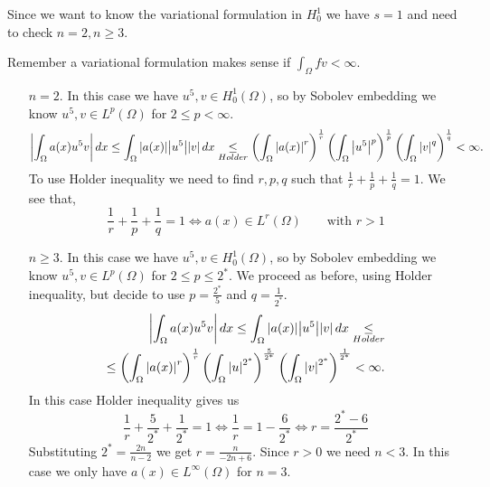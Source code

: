     Since we want to know the variational formulation in \(H^1_0\) we have \(s = 1\) and need to check \(n = 2, n \geq 3\). 
    
    Remember a variational formulation makes sense if \(\int_\Omega fv < \infty\).
    \begin{itemize}
        \item[\(n = 2\).] In this case we have \(u^5, v \in H^1_0(\Omega)\), so by Sobolev embedding we know \(u^5, v \in L^p(\Omega)\) for \(2 \leq p < \infty\). 
        \[
            \abs{\int_\Omega a(x) u^5 v}  \, dx \leq \int_\Omega \abs{a(x)} \abs{u^5} \abs{v} \, dx \underset{Holder}{\leq} \left(\int_\Omega \abs{a(x)}^r\right)^{\frac{1}{r}} \left(\int_\Omega \abs{u^5}^p \right)^{\frac{1}{p}} \left(\int_\Omega \abs{v}^q \right)^{\frac{1}{q}} < \infty.
        \]
        To use Holder inequality we need to find \(r, p, q\) such that \(\frac{1}{r} + \frac{1}{p} + \frac{1}{q} = 1\). We see that, 
        \[
            \frac{1}{r} + \frac{1}{p} + \frac{1}{q} = 1 \iff a(x) \in L^r(\Omega) \qquad \text{with } r > 1
        \]
        \item[\(n \geq 3\).] In this case we have \(u^5, v \in H^1_0(\Omega)\), so by Sobolev embedding we know \(u^5, v \in L^p(\Omega)\) for \(2 \leq p \leq 2^*\).
        We proceed as before, using Holder inequality, but decide to use \(p = \frac{2^*}{5}\) and \(q = \frac{1}{2^*}.\)
        \[
            \begin{split}
                \abs{\int_\Omega a(x) u^5 v}  \, dx \leq \int_\Omega \abs{a(x)} \abs{u^5} \abs{v} \, dx \underset{{Holder}}{\leq} \\
                \leq \left(\int_\Omega \abs{a(x)}^r\right)^{\frac{1}{r}} \left(\int_\Omega \abs{u}^{2^*} \right)^{\frac{5}{2^*}} \left(\int_\Omega \abs{v}^{2^*} \right)^{\frac{1}{2^*}} < \infty.
            \end{split}
        \]
        In this case Holder inequality gives us 
        \[
            \frac{1}{r} + \frac{5}{2^*} + \frac{1}{2^*} = 1 \iff \frac{1}{r} = 1 - \frac{6}{2^*} \iff r = \frac{2^* - 6}{2^*}
        \]
        Substituting \(2^* = \frac{2n}{n - 2}\) we get \(r = \frac{n}{-2n + 6}\). Since \(r > 0\) we need \(n < 3\).
        In this case we only have \(a(x) \in L^\infty(\Omega)\) for \(n = 3\).
    \end{itemize}
    \newpage
    
